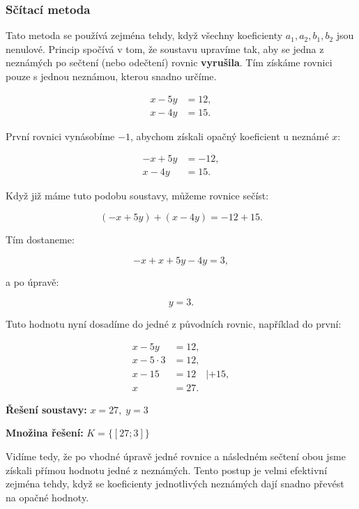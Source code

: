 \documentclass[12pt,a4paper]{article}
\begin{document}
\subsubsection*{Sčítací metoda}

Tato metoda se používá zejména tehdy, když všechny koeficienty \(a_1, a_2, b_1, b_2\) jsou nenulové.  
Princip spočívá v tom, že soustavu upravíme tak, aby se jedna z neznámých po sečtení (nebo odečtení) rovnic \textbf{vyrušila}.  
Tím získáme rovnici pouze s jednou neznámou, kterou snadno určíme.

\begin{align*}
x - 5y &= 12,\\
x - 4y &= 15.
\end{align*}

První rovnici vynásobíme \(-1\), abychom získali opačný koeficient u neznámé \(x\):

\begin{align*}
-x + 5y &= -12,\\ 
x - 4y &= 15.
\end{align*}

Když již máme tuto podobu soustavy, můžeme rovnice sečíst:

\[
(-x + 5y) + (x - 4y) = -12 + 15.
\]

Tím dostaneme:

\[
-x + x + 5y - 4y = 3,
\]

a po úpravě:

\[
y = 3.
\]

Tuto hodnotu nyní dosadíme do jedné z původních rovnic, například do první:

\begin{align*}
x - 5y &= 12,\\
x - 5\cdot 3 &= 12,\\
x - 15 &= 12 \quad | +15,\\
x &= 27.
\end{align*}

\textbf{Řešení soustavy:} \quad \(x = 27,\; y = 3\)

\medskip
\textbf{Množina řešení:} \quad \(K = \{[27;3]\}\)

\medskip
Vidíme tedy, že po vhodné úpravě jedné rovnice a následném sečtení obou jsme získali přímou hodnotu jedné z neznámých.  
Tento postup je velmi efektivní zejména tehdy, když se koeficienty jednotlivých neznámých dají snadno převést na opačné hodnoty.
\end{document}
